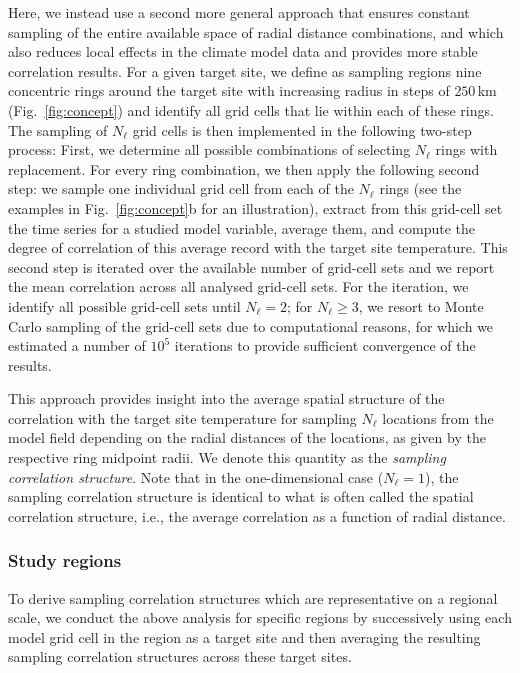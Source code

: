 \documentclass[cp, manuscript]{copernicus}
\begin{document}
Here, we instead use a second more general approach that ensures constant
sampling of the entire available space of radial distance combinations, and
which also reduces local effects in the climate model data and provides more
stable correlation results. For a given target site, we define as sampling
regions nine concentric rings around the target site with increasing radius in
steps of $250$\,km (Fig.~\ref{fig:concept}) and identify all grid cells that lie
within each of these rings. The sampling of $N_{\ell}$ grid cells is then
implemented in the following two-step process: First, we determine all possible
combinations of selecting $N_{\ell}$ rings with replacement. For every ring
combination, we then apply the following second step: we sample one individual
grid cell from each of the $N_{\ell}$ rings (see the examples in
Fig.~\ref{fig:concept}b for an illustration), extract from this grid-cell set
the time series for a studied model variable, average them, and compute the
degree of correlation of this average record with the target site
temperature. This second step is iterated over the available number of grid-cell
sets and we report the mean correlation across all analysed grid-cell sets. For
the iteration, we identify all possible grid-cell sets until $N_{\ell}=2$; for
$N_{\ell}\geq3$, we resort to Monte Carlo sampling of the grid-cell sets due to
computational reasons, for which we estimated a number of $10^5$ iterations to
provide sufficient convergence of the results.

This approach provides insight into the average spatial structure of the
correlation with the target site temperature for sampling $N_{\ell}$ locations
from the model field depending on the radial distances of the locations, as given
by the respective ring midpoint radii. We denote this quantity as the
\emph{sampling correlation structure}. Note that in the one-dimensional case
($N_{\ell}=1$), the sampling correlation structure is identical to what is often
called the spatial correlation structure, i.e., the average correlation as a
function of radial distance.

\subsubsection{Study regions}\label{methods:regions}

To derive sampling correlation structures which are representative on a regional
scale, we conduct the above analysis for specific regions by successively using
each model grid cell in the region as a target site and then averaging the
resulting sampling correlation structures across these target sites.
\end{document}
